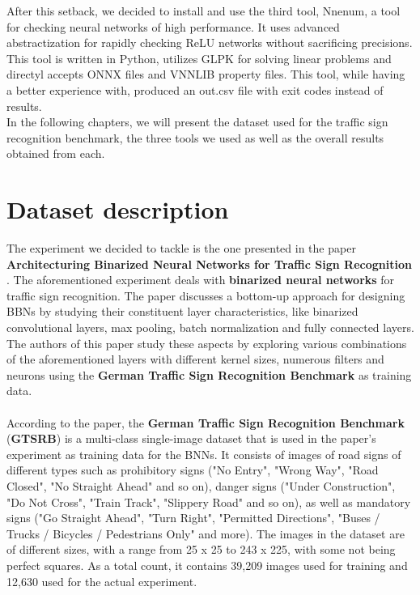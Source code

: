 \documentclass[12pt,a4paper]{report}
\newcommand\tab[1][5mm]{\hspace*{#1}}
\begin{document}
After this setback, we decided to install and use the third tool, Nnenum, a tool for checking neural networks of high performance. It uses advanced abstractization for rapidly checking ReLU networks without sacrificing precisions. This tool is written in Python, utilizes GLPK for solving linear problems and directyl accepts ONNX files and VNNLIB property files. This tool, while having a better experience with, produced an out.csv file with exit codes instead of results.\\
In the following chapters, we will present the dataset used for the traffic sign recognition benchmark, the three tools we used as well as the overall results obtained from each.\\




\chapter{Dataset description}
\tab The experiment we decided to tackle is the one presented in the paper \textbf{Architecturing Binarized Neural Networks for Traffic Sign Recognition} \cite{traffic_signs_paper}. The aforementioned experiment deals with \textbf{binarized neural networks} for traffic sign recognition. The paper discusses a bottom-up approach for designing BBNs by studying their constituent layer characteristics, like binarized convolutional layers, max pooling, batch normalization and fully connected layers. The authors of this paper study these aspects by exploring various combinations of the aforementioned layers with different kernel sizes, numerous filters and neurons using the \textbf{German Traffic Sign Recognition Benchmark} as training data.\\\\
\tab According to the paper, the \textbf{German Traffic Sign Recognition Benchmark} (\textbf{GTSRB}) is a multi-class single-image dataset that is used in the paper's experiment as training data for the BNNs. It consists of images of road signs of different types such as prohibitory signs ("No Entry", "Wrong Way", "Road Closed", "No Straight Ahead" and so on), danger signs ("Under Construction", "Do Not Cross", "Train Track", "Slippery Road" and so on), as well as mandatory signs ("Go Straight Ahead", "Turn Right", "Permitted Directions", "Buses / Trucks / Bicycles / Pedestrians Only" and more). The images in the dataset are of different sizes, with a range from 25 x 25 to 243 x 225, with some not being perfect squares. As a total count, it contains 39,209 images used for training and 12,630 used for the actual experiment.\\\\
\end{document}
